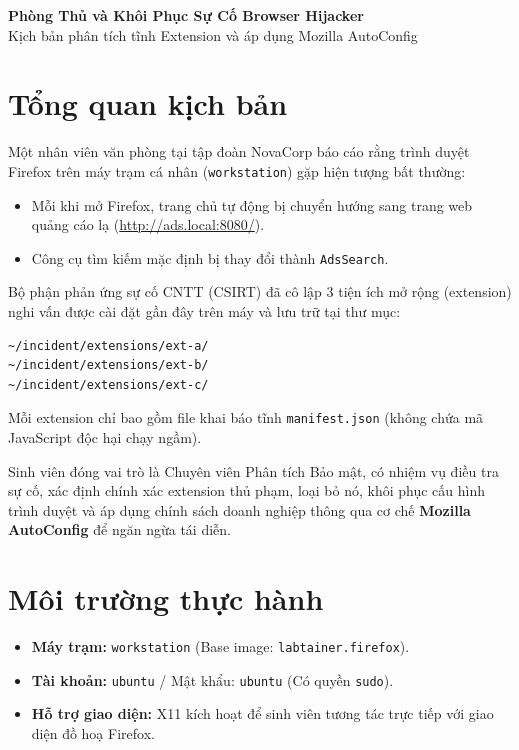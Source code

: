 



\begin{center}
{\LARGE \bfseries Phòng Thủ và Khôi Phục Sự Cố Browser Hijacker}\\
{\large Kịch bản phân tích tĩnh Extension và áp dụng Mozilla AutoConfig}\\
\vspace{0.3cm}
\end{center}

\section{Tổng quan kịch bản}
Một nhân viên văn phòng tại tập đoàn NovaCorp báo cáo rằng trình duyệt Firefox trên máy trạm cá nhân (\texttt{workstation}) gặp hiện tượng bất thường:
\begin{itemize}
    \item Mỗi khi mở Firefox, trang chủ tự động bị chuyển hướng sang trang web quảng cáo lạ (\url{http://ads.local:8080/}).
    \item Công cụ tìm kiếm mặc định bị thay đổi thành \texttt{AdsSearch}.
\end{itemize}
Bộ phận phản ứng sự cố CNTT (CSIRT) đã cô lập 3 tiện ích mở rộng (extension) nghi vấn được cài đặt gần đây trên máy và lưu trữ tại thư mục:
\begin{verbatim}
~/incident/extensions/ext-a/
~/incident/extensions/ext-b/
~/incident/extensions/ext-c/
\end{verbatim}
Mỗi extension chỉ bao gồm file khai báo tĩnh \texttt{manifest.json} (không chứa mã JavaScript độc hại chạy ngầm).

Sinh viên đóng vai trò là Chuyên viên Phân tích Bảo mật, có nhiệm vụ điều tra sự cố, xác định chính xác extension thủ phạm, loại bỏ nó, khôi phục cấu hình trình duyệt và áp dụng chính sách doanh nghiệp thông qua cơ chế \textbf{Mozilla AutoConfig} để ngăn ngừa tái diễn.

\section{Môi trường thực hành}
\begin{itemize}
    \item \textbf{Máy trạm:} \texttt{workstation} (Base image: \texttt{labtainer.firefox}).
    \item \textbf{Tài khoản:} \texttt{ubuntu} / Mật khẩu: \texttt{ubuntu} (Có quyền \texttt{sudo}).
    \item \textbf{Hỗ trợ giao diện:} X11 kích hoạt để sinh viên tương tác trực tiếp với giao diện đồ hoạ Firefox.
\end{itemize}

